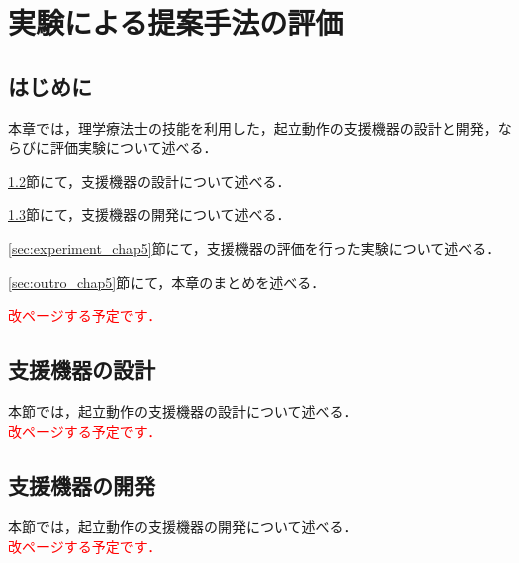 \chapter{実験による提案手法の評価}
\label{chap:development}
\minitoc

\thispagestyle{empty}

\newpage
\section{はじめに}
\label{sec:intro_chap5}

本章では，理学療法士の技能を利用した，起立動作の支援機器の設計と開発，ならびに評価実験について述べる．

\ref{sec:design_chap5}節にて，支援機器の設計について述べる．

\ref{sec:development_chap5}節にて，支援機器の開発について述べる．

\ref{sec:experiment_chap5}節にて，支援機器の評価を行った実験について述べる．

\ref{sec:outro_chap5}節にて，本章のまとめを述べる．

\textcolor{red}{改ページする予定です．}
\section{支援機器の設計}
\label{sec:design_chap5}

本節では，起立動作の支援機器の設計について述べる．\\

\textcolor{red}{改ページする予定です．}
\section{支援機器の開発}
\label{sec:development_chap5}

本節では，起立動作の支援機器の開発について述べる．\\

\textcolor{red}{改ページする予定です．}
